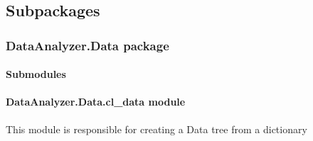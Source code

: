 \documentclass[letterpaper,10pt,english]{sphinxmanual}
\begin{document}
\subsection{Subpackages}
\label{\detokenize{DataAnalyzer:subpackages}}

\subsubsection{DataAnalyzer.Data package}
\label{\detokenize{DataAnalyzer.Data:dataanalyzer-data-package}}\label{\detokenize{DataAnalyzer.Data::doc}}

\paragraph{Submodules}
\label{\detokenize{DataAnalyzer.Data:submodules}}

\paragraph{DataAnalyzer.Data.cl\_data module}
\label{\detokenize{DataAnalyzer.Data:module-DataAnalyzer.Data.cl_data}}\label{\detokenize{DataAnalyzer.Data:dataanalyzer-data-cl-data-module}}
This module is responsible for creating a Data tree from a dictionary
\end{document}
